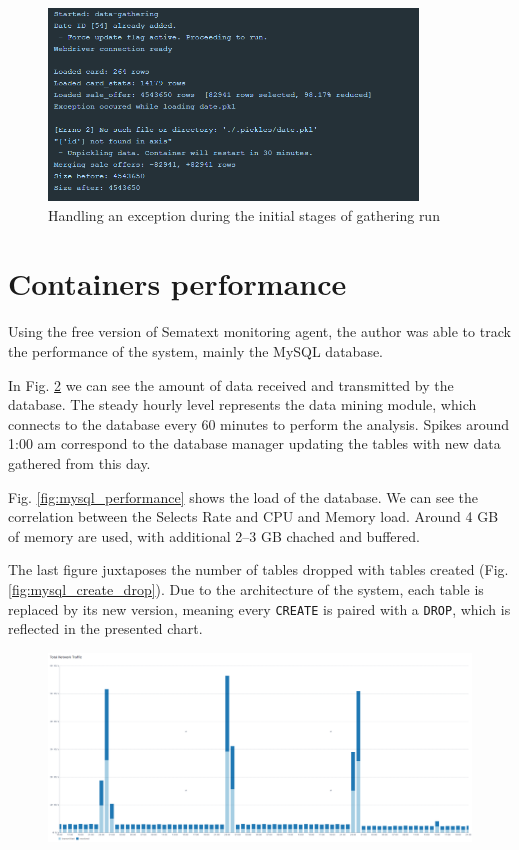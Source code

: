 \begin{figure}
    \centering
    \includegraphics[width=0.875\textwidth]{figures/exception_handling.png}
    \caption{Handling an exception during the initial stages of gathering run}
    \label{fig:exception_handling}
\end{figure}


\section{Containers performance}
Using the free version of Sematext monitoring agent, the author was able to track the performance of the system, mainly the MySQL database. \par
In Fig. \ref{fig:mysql_network} we can see the amount of data received and transmitted by the database. The steady hourly level represents the data mining module, which connects to the database every 60 minutes to perform the analysis. Spikes around 1:00 am correspond to the database manager updating the tables with new data gathered from this day. \par
Fig. \ref{fig:mysql_performance} shows the load of the database. We can see the correlation between the Selects Rate and CPU and Memory load. Around 4 GB of memory are used, with additional 2--3 GB chached and buffered. \par
The last figure juxtaposes the number of tables dropped with tables created (Fig. \ref{fig:mysql_create_drop}). Due to the architecture of the system, each table is replaced by its new version, meaning every \texttt{CREATE} is paired with a \texttt{DROP}, which is reflected in the presented chart.

\begin{figure}
    \centering
    \includegraphics[width=\textwidth]{figures/mysql_network.png}
    \caption{}
    \label{fig:mysql_network}
\end{figure}


